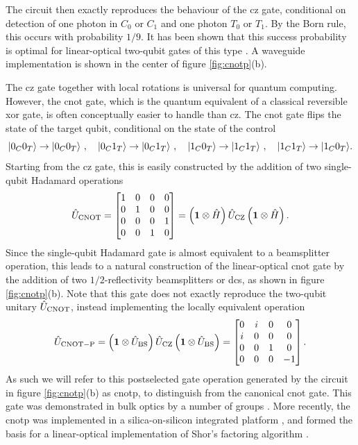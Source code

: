 The circuit then exactly reproduces the behaviour of the \gls{cz} gate, conditional on detection of one photon in $C_0$ or $C_1$ and one photon $T_0$ or $T_1$. By the Born rule, this occurs with probability $1/9$. It has been shown that this success probability is optimal for linear-optical two-qubit gates of this type \cite{Ralph2004}.
A waveguide implementation is shown in the center of figure \ref{fig:cnotp}(b).

The \gls{cz} gate together with local rotations is universal for quantum computing. However, the \gls{cnot} gate, which is the quantum equivalent of a classical reversible \gls{xor} gate, is often conceptually easier to handle than \gls{cz}. The \gls{cnot} gate flips the state of the target qubit, conditional on the state of the control 
\begin{equation}
    \mbox{$ | 0_C0_T \rangle $} \rightarrow \mbox{$ | 0_C0_T \rangle $}~, \quad
    \mbox{$ | 0_C1_T \rangle $} \rightarrow \mbox{$ | 0_C1_T \rangle $}~, \quad
    \mbox{$ | 1_C0_T \rangle $} \rightarrow \mbox{$ | 1_C1_T \rangle $}~, \quad
    \mbox{$ | 1_C1_T \rangle $} \rightarrow \mbox{$ | 1_C0_T \rangle $}.
\end{equation}
Starting from the \gls{cz} gate, this is easily constructed by the addition of two single-qubit Hadamard operations
\begin{equation}
    \hat{U}_\mathrm{CNOT} =
    \begin{bmatrix}
    1 & 0 & 0 & 0 \\
    0 & 1 & 0 & 0 \\
    0 & 0 & 0 & 1 \\
    0 & 0 & 1 & 0 
    \end{bmatrix} =
   \left(\mathbf{1} \otimes \hat{H} \right) 
   \hat{U}_\mathrm{CZ} 
   \left(\mathbf{1} \otimes \hat{H} \right).
\end{equation}
Since the single-qubit Hadamard gate is almost equivalent to a beamsplitter operation, this leads to a natural construction of the linear-optical \gls{cnot} gate by the addition of two $1/2$-reflectivity beamsplitters or \glspl{dc}, as shown in figure \ref{fig:cnotp}(b). Note that this gate does not exactly reproduce the two-qubit unitary $\hat{U}_\mathrm{CNOT}$, instead implementing the locally equivalent operation
\begin{equation}
    \hat{U}_\mathrm{CNOT-P} = 
   \left(\mathbf{1} \otimes \hat{U}_\mathrm{BS} \right) 
   \hat{U}_\mathrm{CZ} 
   \left(\mathbf{1} \otimes \hat{U}_\mathrm{BS} \right) = 
    \begin{bmatrix}
    0 & i & 0 & 0 \\
    i & 0 & 0 & 0 \\
    0 & 0 & 1 & 0 \\
    0 & 0 & 0 & -1 
    \end{bmatrix}.
\end{equation}
As such we will refer to this postselected gate operation generated by the circuit in figure \ref{fig:cnotp}(b) as \gls{cnotp}, to distinguish from the canonical \gls{cnot} gate. This gate was demonstrated in bulk optics by a number of groups \cite{Pittman2002, Franson2002, OBrien2003, OBrien2004}. More recently, the \gls{cnotp} was implemented in a silica-on-silicon integrated platform \cite{Politi2009}, and formed the basis for a linear-optical implementation of Shor's factoring algorithm \cite{Politi2009a}.

